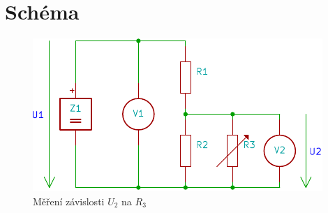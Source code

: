 \section{Schéma}
  \begin{figure}[htbp]
    \centering
    \includegraphics{../sch.pdf}
    \caption{Měření závislosti $U_2$ na $R_3$}
    \label{sch:main}
  \end{figure}
